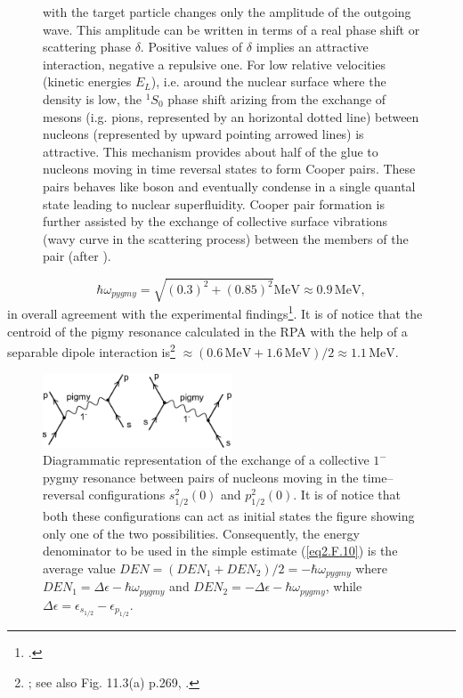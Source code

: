 \begin{figure}
{    with the target particle changes only the amplitude of the outgoing wave. This amplitude can be written in terms of a real phase
    shift  or scattering phase $\delta$. Positive values of $\delta$ implies an attractive interaction, negative a repulsive one. For low relative velocities
    (kinetic energies $E_L$), i.e. around the nuclear surface where the density is low, the $^1S_0$ phase shift arizing from the exchange of mesons
    (i.g. pions, represented by an horizontal dotted  line) between nucleons (represented by upward pointing arrowed lines)
    is attractive. This mechanism provides about half of the glue to nucleons moving in time reversal states to form Cooper pairs. These
    pairs behaves like boson and eventually condense in a single quantal state leading to nuclear superfluidity. Cooper pair formation is
    further assisted by the exchange of collective surface vibrations (wavy curve in the scattering process) between the members of the
    pair (after \cite{Broglia:02d}).}\label{fig1F1}
  \end{figure}
\begin{equation*}
\hbar \omega_{pygmy}=\sqrt{(0.3)^2+(0.85)^2}\text{MeV}\approx 0.9\, \text{MeV},
\end{equation*}  
 in overall agreement with the experimental findings\footnote{\cite{Zinser:97,Kanungo:15}.}. It is of notice that the centroid of the pigmy resonance calculated in the RPA with the help of a separable dipole interaction is\footnote{\cite{Barranco:01}; see also Fig. 11.3(a) p.269, \cite{Brink:05}.} $\approx (0.6\,\text{MeV}+ 1.6\, \text{MeV})/2\approx 1.1\, \text{MeV}$.
 \begin{figure}
 \centerline{\includegraphics*[width=0.5\textwidth,angle=0]{nutshell/figs/pigmy.pdf}}
 \caption{Diagrammatic representation of the exchange of a collective $1^-$ pygmy resonance between pairs of nucleons moving in the time--reversal configurations $s_{1/2}^2(0)$ and $p_{1/2}^2(0)$. It is of notice that both these configurations can act as initial states  the figure showing only one of the two possibilities. Consequently, the energy denominator to be used in the simple estimate (\ref{eq2.F.10}) is the average value $DEN=(DEN_1+DEN_2)/2=-\hbar\omega_{pygmy}$ where $DEN_1=\Delta \epsilon-\hbar\omega_{pygmy}$ and $DEN_2=-\Delta\epsilon-\hbar\omega_{pygmy}$, while $\Delta\epsilon=\epsilon_{s_{1/2}}-\epsilon_{p_{1/2}}$.}\label{pigmy}
 \end{figure}
